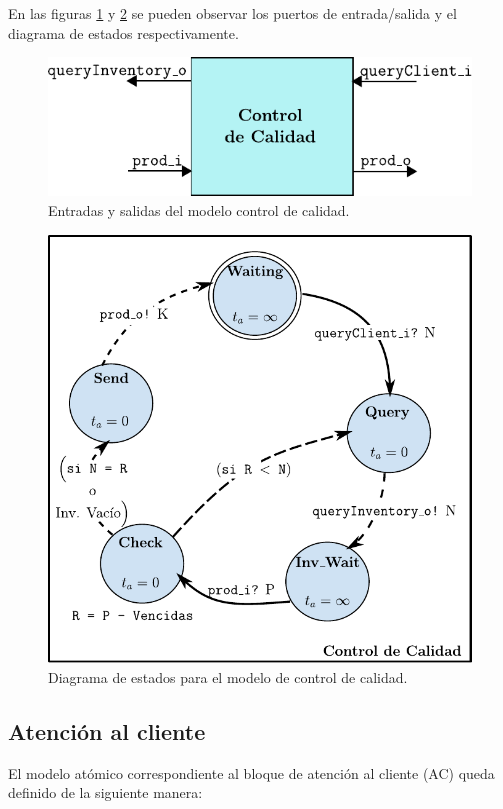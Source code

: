 \documentclass[10pt]{article}
\begin{document}
En las figuras \ref{fig:CC-esquematico} y \ref{fig:CC-estados} se pueden observar los puertos de entrada/salida y el diagrama de estados respectivamente.

\begin{figure}[h]
	\centering
	\includegraphics{img/CC-esquematico}
	\caption{Entradas y salidas del modelo control de calidad.}
	\label{fig:CC-esquematico}
\end{figure}

\begin{figure}[h]
	\centering
	\includegraphics{img/controlCalidaddevsgraph}
	\caption{Diagrama de estados para el modelo de control de calidad.}
	\label{fig:CC-estados}
\end{figure}
\FloatBarrier

\subsection{Atención al cliente\label{sec:AC}}
El modelo atómico correspondiente al bloque de atención al cliente (AC) queda definido de la siguiente manera:
\end{document}
